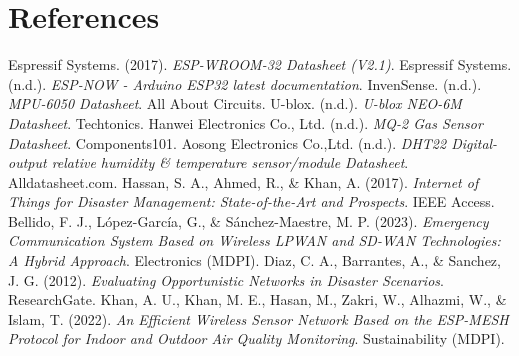 \documentclass[12pt, a4paper]{article}
\begin{document}
\section{References}
\begin{thebibliography}{99}
     Espressif Systems. (2017). \textit{ESP-WROOM-32 Datasheet (V2.1)}.
     Espressif Systems. (n.d.). \textit{ESP-NOW - Arduino ESP32 latest documentation}.
     InvenSense. (n.d.). \textit{MPU-6050 Datasheet}. All About Circuits.
     U-blox. (n.d.). \textit{U-blox NEO-6M Datasheet}. Techtonics.
     Hanwei Electronics Co., Ltd. (n.d.). \textit{MQ-2 Gas Sensor Datasheet}. Components101.
     Aosong Electronics Co.,Ltd. (n.d.). \textit{DHT22 Digital-output relative humidity \& temperature sensor/module Datasheet}. Alldatasheet.com.
     Hassan, S. A., Ahmed, R., \& Khan, A. (2017). \textit{Internet of Things for Disaster Management: State-of-the-Art and Prospects}. IEEE Access.
     Bellido, F. J., López-García, G., \& Sánchez-Maestre, M. P. (2023). \textit{Emergency Communication System Based on Wireless LPWAN and SD-WAN Technologies: A Hybrid Approach}. Electronics (MDPI).
     Diaz, C. A., Barrantes, A., \& Sanchez, J. G. (2012). \textit{Evaluating Opportunistic Networks in Disaster Scenarios}. ResearchGate.
     Khan, A. U., Khan, M. E., Hasan, M., Zakri, W., Alhazmi, W., & Islam, T. (2022). \textit{An Efficient Wireless Sensor Network Based on the ESP-MESH Protocol for Indoor and Outdoor Air Quality Monitoring}. Sustainability (MDPI).
\end{thebibliography}
\end{document}
